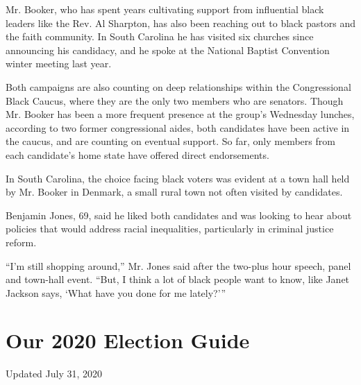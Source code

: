 Mr. Booker, who has spent years cultivating support from influential
black leaders like the Rev. Al Sharpton, has also been reaching out to
black pastors and the faith community. In South Carolina he has visited
six churches since announcing his candidacy, and he spoke at the
National Baptist Convention winter meeting last year.

Both campaigns are also counting on deep relationships within the
Congressional Black Caucus, where they are the only two members who are
senators. Though Mr. Booker has been a more frequent presence at the
group's Wednesday lunches, according to two former congressional aides,
both candidates have been active in the caucus, and are counting on
eventual support. So far, only members from each candidate's home state
have offered direct endorsements.

In South Carolina, the choice facing black voters was evident at a town
hall held by Mr. Booker in Denmark, a small rural town not often visited
by candidates.

Benjamin Jones, 69, said he liked both candidates and was looking to
hear about policies that would address racial inequalities, particularly
in criminal justice reform.

``I'm still shopping around,'' Mr. Jones said after the two-plus hour
speech, panel and town-hall event. ``But, I think a lot of black people
want to know, like Janet Jackson says, `What have you done for me
lately?'''

\hypertarget{our-2020-election-guide}{%
\section{Our 2020 Election Guide}\label{our-2020-election-guide}}

Updated July 31, 2020

